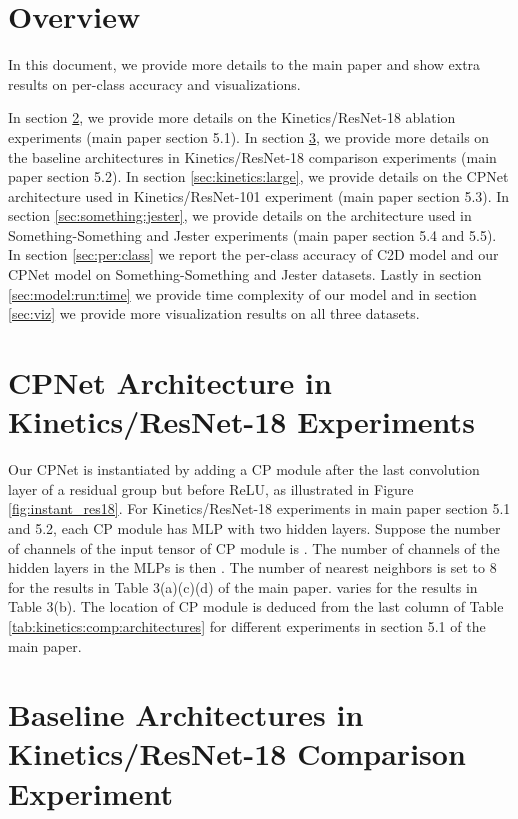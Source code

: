 \documentclass[10pt,twocolumn,letterpaper]{article}
\begin{document}
\section{Overview}

In this document, we provide more details to the main paper and show extra results on per-class accuracy and visualizations.

In section \ref{sec:kinetics:ablation}, we provide more details on the Kinetics/ResNet-18 ablation experiments (main paper section 5.1).
In section \ref{sec:kinetics:comp}, we provide more details on the baseline architectures in Kinetics/ResNet-18 comparison experiments (main paper section 5.2).
In section \ref{sec:kinetics:large}, we provide details on the CPNet architecture used  in Kinetics/ResNet-101 experiment (main paper section 5.3).
In section \ref{sec:something:jester}, we provide details on the architecture used  in Something-Something and Jester experiments (main paper section 5.4 and 5.5).
In section \ref{sec:per:class} we report the per-class accuracy of C2D model and our CPNet model on Something-Something and Jester datasets. Lastly in section \ref{sec:model:run:time} we provide time complexity of our model and in section \ref{sec:viz} we provide more visualization results on all three datasets.

\section{CPNet Architecture in  Kinetics/ResNet-18 Experiments}
\label{sec:kinetics:ablation}

Our CPNet is instantiated by adding a CP module after the last convolution layer of a residual group but before ReLU, as illustrated in Figure \ref{fig:instant_res18}. For Kinetics/ResNet-18 experiments in main paper section 5.1 and 5.2, each CP module has MLP with two hidden layers.
Suppose the number of channels of the input tensor of CP module is . The number of channels of the hidden layers in the MLPs is then . The number of nearest neighbors  is set to 8 for the results in Table 3(a)(c)(d) of the main paper.   varies for the results in Table 3(b). The location of CP module is deduced from the last column of Table  \ref{tab:kinetics:comp:architectures} for different experiments in section 5.1 of the main paper.

\section{Baseline Architectures in Kinetics/ResNet-18 Comparison Experiment}
\label{sec:kinetics:comp}
\end{document}

